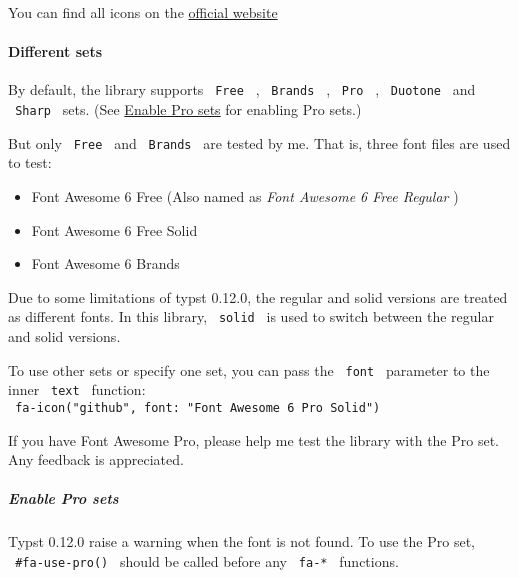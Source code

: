 You can find all icons on the
\href{https://fontawesome.com/search}{official website}

\paragraph{Different sets}\label{different-sets}

By default, the library supports \texttt{\ Free\ } , \texttt{\ Brands\ }
, \texttt{\ Pro\ } , \texttt{\ Duotone\ } and \texttt{\ Sharp\ } sets.
(See
\href{https://github.com/typst/packages/raw/main/packages/preview/fontawesome/0.5.0/\#enable-pro-sets}{Enable
Pro sets} for enabling Pro sets.)

But only \texttt{\ Free\ } and \texttt{\ Brands\ } are tested by me.
That is, three font files are used to test:

\begin{itemize}
\tightlist
\item
  Font Awesome 6 Free (Also named as \emph{Font Awesome 6 Free Regular}
  )
\item
  Font Awesome 6 Free Solid
\item
  Font Awesome 6 Brands
\end{itemize}

Due to some limitations of typst 0.12.0, the regular and solid versions
are treated as different fonts. In this library, \texttt{\ solid\ } is
used to switch between the regular and solid versions.

To use other sets or specify one set, you can pass the \texttt{\ font\ }
parameter to the inner \texttt{\ text\ } function:\\
\texttt{\ fa-icon("github",\ font:\ "Font\ Awesome\ 6\ Pro\ Solid")\ }

If you have Font Awesome Pro, please help me test the library with the
Pro set. Any feedback is appreciated.

\subparagraph{Enable Pro sets}\label{enable-pro-sets}

Typst 0.12.0 raise a warning when the font is not found. To use the Pro
set, \texttt{\ \#fa-use-pro()\ } should be called before any
\texttt{\ fa-*\ } functions.

\begin{Shaded}
\begin{Highlighting}[]

\end{Highlighting}
\end{Shaded}

